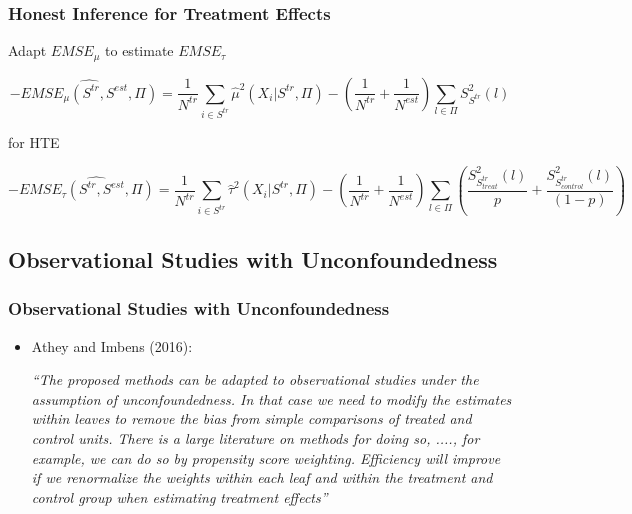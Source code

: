 \documentclass[
  shownotes,
  xcolor={svgnames},
  hyperref={colorlinks,citecolor=DarkBlue,linkcolor=DarkRed,urlcolor=DarkBlue}
  , aspectratio=169]{beamer}
\begin{document}
\begin{frame}[fragile]
\frametitle{Honest Inference for Treatment Effects}



Adapt $EMSE_{\mu}$ to estimate $EMSE_{\tau}$

\[
-\hat{EMSE_{\mu}(S^{tr},S^{est},\Pi)}=\frac{1}{N^{tr}}\sum_{i\in S^{tr}}\hat{\mu}^{2}(X_{i}|S^{tr},\Pi)-\left(\frac{1}{N^{tr}}+\frac{1}{N^{est}}\right)\sum_{l\in\Pi}S_{S^{tr}}^{2}(l)
\]

for HTE

\[
-\hat{EMSE_{\tau}(S^{tr},S^{est},\Pi)=}\frac{1}{N^{tr}}\sum_{i\in S^{tr}}\hat{\tau}^{2}(X_{i}|S^{tr},\Pi)-\left(\frac{1}{N^{tr}}+\frac{1}{N^{est}}\right)\sum_{l\in\Pi}\left(\frac{S_{S_{treat}^{tr}}^{2}(l)}{p}+\frac{S_{S_{control}^{tr}}^{2}(l)}{(1-p)}\right)
\]


\end{frame}
\subsection{Observational Studies with Unconfoundedness}
\begin{frame}[fragile]
\frametitle{Observational Studies with Unconfoundedness}

\begin{itemize}
\item Athey and Imbens (2016):

\medskip

{\it ``The proposed methods can be adapted to observational studies under the assumption of unconfoundedness. In that case we need to modify the estimates within leaves to remove the bias from simple comparisons of treated and control units. There is a large literature on methods for doing so, ...., for example, we can do so by propensity score weighting. Efficiency will improve if we renormalize the weights within each leaf and within the treatment and control group when estimating treatment effects''}
\end{itemize}

\end{frame}
\end{document}
